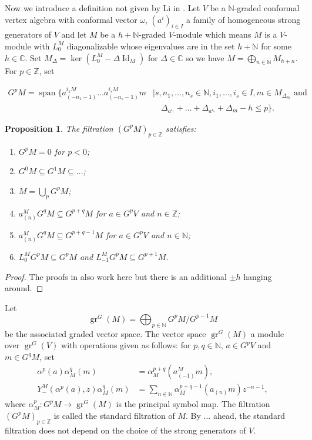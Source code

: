\documentclass[a4paper, 12pt, reqno]{amsart}
\newtheorem{proposition}[theorem]{Proposition}
\theoremstyle{remark}
\numberwithin{equation}{subsection}
\DeclareMathOperator{\Id}{Id}
\DeclareMathOperator{\gr}{gr}
\DeclareMathOperator{\vspan}{span}
\begin{document}
Now we introduce a definition not given by Li in \cite{li_vertex_2004}.
Let $V$ be a $\mathbb{N}$-graded conformal vertex algebra with conformal vector $\omega$, $(a^i)_{i \in I}$ a family of homogeneous strong generators of $V$ and let $M$ be a $h + \mathbb{N}$-graded $V$-module which means $M$ is a $V$-module with $L_0^M$ diagonalizable whose eigenvalues are in the set $h + \mathbb{N}$ for some $h \in \mathbb{C}$.
Set $M_\Delta = \ker(L^M_0 - \Delta\Id_M)$ for $\Delta \in \mathbb{C}$ so we have $M = \bigoplus_{n \in \mathbb{N}}M_{h + n}$.
For $p \in \mathbb{Z}$, set

\begin{equation*}
  \begin{split}
    G^pM = \vspan\{a^{i_1M}_{(-n_1 - 1)}\dots a^{i_sM}_{(-n_s - 1)}m &\mid s, n_1, \dots, n_s \in \mathbb{N}, i_1, \dots, i_s \in I, m \in M_{\Delta_m} \text{ and }\\
    &\quad \Delta_{a^{i_1}} + \dots + \Delta_{a^{i_s}} + \Delta_m - h \le p\}.
  \end{split}
\end{equation*}

\begin{proposition}
  \label{prp:11}
  The filtration $(G^pM)_{p\in \mathbb{Z}}$ satisfies:
  \begin{enumerate}
  \item $G^pM = 0$ for $p < 0$;
  \item $G^0M \subseteq G^1M \subseteq \dots$;
  \item $M = \bigcup_pG^pM$;
  \item $a^M_{(n)}G^qM \subseteq G^{p + q}M$ for $a \in G^pV$ and $n \in \mathbb{Z}$;
  \item $a^M_{(n)}G^qM \subseteq G^{p + q - 1}M$ for $a \in G^pV$ and $n \in \mathbb{N}$;
  \item $L^M_0G^pM \subseteq G^pM$ and $L^M_{-1}G^pM \subseteq G^{p + 1}M$.
  \end{enumerate}
\end{proposition}

\begin{proof}
  The proofs in \cite{li_vertex_2004} also work here but there is an additional $\pm h$ hanging around.
\end{proof}

Let
\begin{equation*}
  \gr^G(M) = \bigoplus_{p \in \mathbb{N}}G^pM/G^{p - 1}M
\end{equation*}
be the associated graded vector space.
The vector space $\gr^G(M)$ a module over $\gr^G(V)$ with operations given as follows: for $p, q \in \mathbb{N}$, $a \in G^pV$ and $m \in G^qM$, set
\begin{align*}
  \alpha^p(a)\alpha_M^q(m) &= \alpha_M^{p + q}(a^M_{(-1)}m), \\
  Y^M_-(\alpha^p(a), z)\alpha_M^q(m) &= \sum_{n \in \mathbb{N}}\alpha_M^{p + q - 1}(a_{(n)}m)z^{-n - 1},
\end{align*}
where $\alpha_M^p: G^pM \to \gr^G(M)$ is the principal symbol map.
The filtration $(G^pM)_{p \in \mathbb{Z}}$ is called the standard filtration of $M$.
By ... ahead, the standard filtration does not depend on the choice of the strong generators of $V$.
\end{document}
